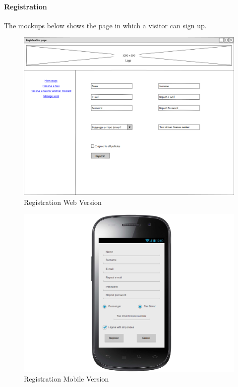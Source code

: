 \documentclass[a4paper,12pt]{article}%
\begin{document}
\paragraph{Registration}
The mockups below shows the page in which a visitor can sign up.
\begin{figure}[H]
\centering
\includegraphics[scale=0.35]{mockups/registration_web.png}
\caption{Registration Web Version}
\end{figure}
\begin{figure}[H]
\centering
\includegraphics[scale=0.35]{mockups/registration_mobile.png}
\caption{Registration Mobile Version}
\end{figure}
\break
\end{document}
